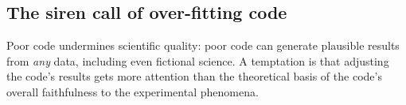 \subsection{The siren call of over-fitting code}\label{over-fit}



\noindent
Poor code undermines scientific quality: poor code can generate plausible results from \emph{any\/} data, including even fictional science. A temptation is that %
adjusting the code's results gets more attention than the theoretical basis of the code's overall faithfulness to the experimental phenomena. 
\def\imageWidthCalculation{\multiply \imageWidth by 21 \divide \imageWidth by 28}
\def\figureStarDetails{*}

